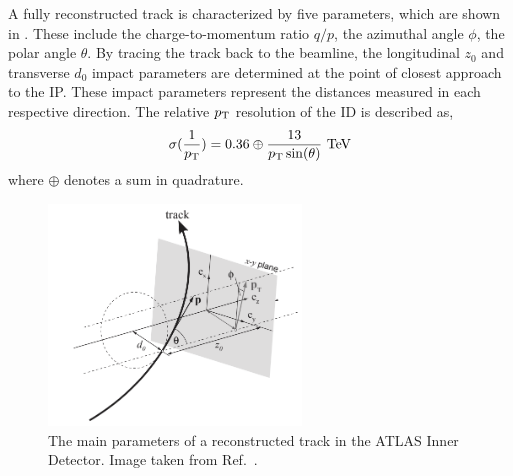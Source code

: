 A fully reconstructed track is characterized by five parameters, which are shown in .
These include the charge-to-momentum ratio $q/p$, the azimuthal angle $\phi$, the polar angle $\theta$.
By tracing the track back to the beamline, the longitudinal $z_0$ and transverse $d_0$ impact parameters are determined at the point of closest approach to the IP\@.
These impact parameters represent the distances measured in each respective direction.
The relative $p_\mathrm{T}$ resolution of the ID is described as,
\begin{equation}
    \sigma(\frac{1}{\pt}) = 0.36 \oplus \frac{13}{\pt \sin(\theta)}~\TeV
\end{equation}
where $\oplus$ denotes a sum in quadrature.

\begin{figure}[htb]
    \centering
    \includegraphics[width=0.6\textwidth]{Figures/cern_atlas/Track.png}
    \caption{The main parameters of a reconstructed track in the ATLAS Inner Detector. Image taken from Ref.~\cite{ATLASTrackingSoftware}.}
    \label{fig:track_parameters}
\end{figure}

